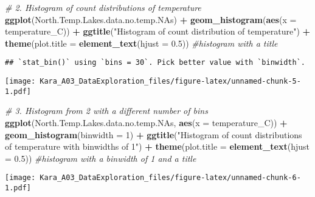 \documentclass[]{article}
\newenvironment{Shaded}{\begin{snugshade}}{\end{snugshade}}
\newcommand{\KeywordTok}[1]{\textcolor[rgb]{0.13,0.29,0.53}{\textbf{#1}}}
\newcommand{\DataTypeTok}[1]{\textcolor[rgb]{0.13,0.29,0.53}{#1}}
\newcommand{\DecValTok}[1]{\textcolor[rgb]{0.00,0.00,0.81}{#1}}
\newcommand{\FloatTok}[1]{\textcolor[rgb]{0.00,0.00,0.81}{#1}}
\newcommand{\StringTok}[1]{\textcolor[rgb]{0.31,0.60,0.02}{#1}}
\newcommand{\CommentTok}[1]{\textcolor[rgb]{0.56,0.35,0.01}{\textit{#1}}}
\newcommand{\OperatorTok}[1]{\textcolor[rgb]{0.81,0.36,0.00}{\textbf{#1}}}
\newcommand{\NormalTok}[1]{#1}
\begin{document}
\begin{Shaded}
\begin{Highlighting}[]
\CommentTok{# 2. Histogram of count distributions of temperature}
\KeywordTok{ggplot}\NormalTok{(North.Temp.Lakes.data.no.temp.NAs) }\OperatorTok{+}
\StringTok{  }\KeywordTok{geom_histogram}\NormalTok{(}\KeywordTok{aes}\NormalTok{(}\DataTypeTok{x =}\NormalTok{ temperature_C)) }\OperatorTok{+}\StringTok{ }
\StringTok{  }\KeywordTok{ggtitle}\NormalTok{(}\StringTok{"Histogram of count distribution of temperature"}\NormalTok{) }\OperatorTok{+}\StringTok{ }
\StringTok{  }\KeywordTok{theme}\NormalTok{(}\DataTypeTok{plot.title =} \KeywordTok{element_text}\NormalTok{(}\DataTypeTok{hjust =} \FloatTok{0.5}\NormalTok{)) }\CommentTok{#histogram with a title}
\end{Highlighting}
\end{Shaded}

\begin{verbatim}
## `stat_bin()` using `bins = 30`. Pick better value with `binwidth`.
\end{verbatim}

\texttt{[image: Kara\_A03\_DataExploration\_files/figure-latex/unnamed-chunk-5-1.pdf]}

\begin{Shaded}
\begin{Highlighting}[]
\CommentTok{# 3. Histogram from 2 with a different number of bins}
\KeywordTok{ggplot}\NormalTok{(North.Temp.Lakes.data.no.temp.NAs, }\KeywordTok{aes}\NormalTok{(}\DataTypeTok{x =}\NormalTok{ temperature_C)) }\OperatorTok{+}
\StringTok{  }\KeywordTok{geom_histogram}\NormalTok{(}\DataTypeTok{binwidth =} \DecValTok{1}\NormalTok{) }\OperatorTok{+}\StringTok{ }
\StringTok{  }\KeywordTok{ggtitle}\NormalTok{(}\StringTok{"Histogram of count distributions of temperature with binwidths of 1"}\NormalTok{) }\OperatorTok{+}\StringTok{ }
\StringTok{  }\KeywordTok{theme}\NormalTok{(}\DataTypeTok{plot.title =} \KeywordTok{element_text}\NormalTok{(}\DataTypeTok{hjust =} \FloatTok{0.5}\NormalTok{)) }\CommentTok{#histogram with a binwidth of 1 and a title}
\end{Highlighting}
\end{Shaded}

\texttt{[image: Kara\_A03\_DataExploration\_files/figure-latex/unnamed-chunk-6-1.pdf]}
\end{document}
